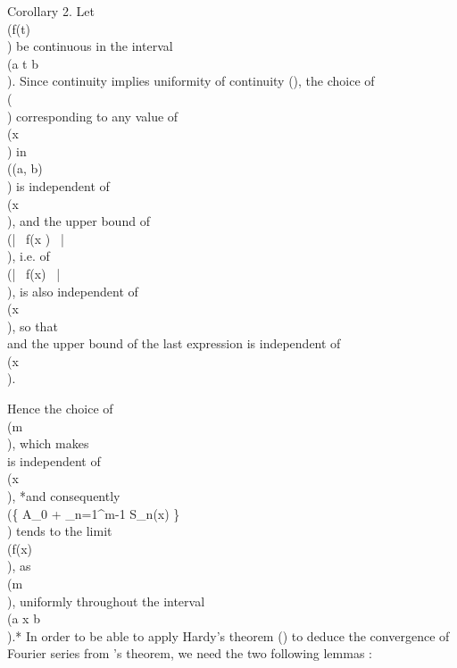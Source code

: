 Corollary 2. Let \\(f(t)\\) be continuous in the interval \\(a \leq t \leq b\\). Since
continuity implies uniformity of continuity (), the choice of
\\(\delta\\) corresponding to any value of \\(x\\) in \\((a, b)\\) is independent of \\(x\\), and the
upper bound of \\(\left| \, f(x ) \, \right| \\), i.e. of \\(\left| \, f(x) \, \right| \\), is also independent of \\(x\\),
so that
\\[ \begin{align*}
  \int_{0}^{\frac{1}{2} \pi}\! \left| \, \phi(\theta) \, \right|  \, d \theta
  =&
  \int_{0}^{\frac{1}{2} \pi}\!
  \left| \, 
    f(x \pm 2\theta) - f(x \pm 0)
   \, \right| 
  \, d \theta
  \\
  \leq
  &
  \frac{1}{2} \int_{-\pi}^{\pi}\! \left| \, f(t) \, \right|  \, d t
  + \frac{1}{2} \pi \left| \, f(x \pm 0) \, \right| ,
\end{align*} \\]
and the upper bound of the last expression is independent of \\(x\\).

Hence the choice of \\(m\\), which makes
\\[ 
\left| \, 
  \frac{1}{m}
  \int_{0}^{\frac{1}{2} \pi}\!
  \frac{\sin^{2} m \theta}{\sin^{2} \theta}
  \phi(\theta)
  \, d \theta
 \, \right| 
<
\pi \eps,
\\] 
is independent of \\(x\\), *and consequently
  \\(\left\{
    A_{0} + \sum_{n=1}^{m-1} S_{n}(x)
  \right\}\\) tends to the limit \\(f(x)\\), as \\(m \rightarrow \infty\\),
  uniformly throughout the interval \\(a \leq x \leq b\\).*
In order to be able to apply Hardy's theorem () to deduce the
convergence of Fourier series from \Fejer's theorem, we need the two
following lemmas :

